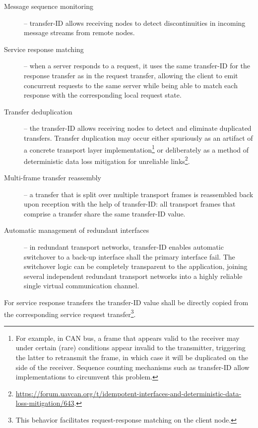 \begin{description}
    \item[Message sequence monitoring] -- transfer-ID allows receiving nodes to detect discontinuities
    in incoming message streams from remote nodes.

    \item[Service response matching] -- when a server responds to a request, it uses the same transfer-ID for the
    response transfer as in the request transfer,
    allowing the client to emit concurrent requests to the same server while being able to
    match each response with the corresponding local request state.

    \item[Transfer deduplication] -- the transfer-ID allows receiving nodes to detect and eliminate duplicated
    transfers.
    Transfer duplication may occur either spuriously as an artifact of a concrete
    transport layer implementation\footnote{%
        For example, in CAN bus, a frame that appears valid to the receiver may under certain (rare) conditions
        appear invalid to the transmitter, triggering the latter to retransmit the frame,
        in which case it will be duplicated on the side of the receiver.
        Sequence counting mechanisms such as transfer-ID allow implementations to circumvent this problem.
    } or deliberately as a method of deterministic data loss mitigation for unreliable links\footnote{%
        \url{https://forum.uavcan.org/t/idempotent-interfaces-and-deterministic-data-loss-mitigation/643}.
    }.

    \item[Multi-frame transfer reassembly] -- a transfer that is split over multiple transport frames is reassembled
    back upon reception with the help of transfer-ID: all transport frames that comprise a transfer
    share the same transfer-ID value.

    \item[Automatic management of redundant interfaces] -- in redundant transport networks,
    transfer-ID enables automatic switchover to a back-up interface shall the primary interface fail.
    The switchover logic can be completely transparent to the application, joining several independent
    redundant transport networks into a highly reliable single virtual communication channel.
\end{description}

For service response transfers the transfer-ID value shall be directly copied from the corresponding
service request transfer\footnote{This behavior facilitates request-response matching on the client node.}.

